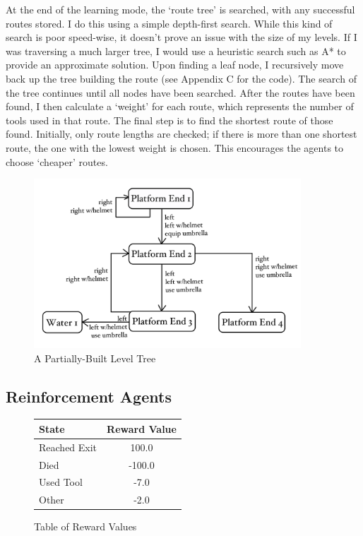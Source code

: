 \documentclass[a4paper,oneside]{report}
\begin{document}
At the end of the learning mode, the `route tree' is searched, with any successful routes stored. I do this using a simple depth-first search. While this kind of search is poor speed-wise, it doesn't prove an issue with the size of my levels. If I was traversing a much larger tree, I would use a heuristic search such as A* to provide an approximate solution. Upon finding a leaf node, I recursively move back up the tree building the route (see Appendix C for the code). The search of the tree continues until all nodes have been searched. After the routes have been found, I then calculate a `weight' for each route, which represents the number of tools used in that route. The final step is to find the shortest route of those found. Initially, only route lengths are checked; if there is more than one shortest route, the one with the lowest weight is chosen. This encourages the agents to choose `cheaper' routes.
  
\begin{figure}[H]
  \centering
    \includegraphics[width=100mm]{sources/images/TreeSample}
    \caption{A Partially-Built Level Tree}
    \label{fig:TreeSample}
\end{figure}

\subsection{Reinforcement Agents}

\begin{figure}
\centering
\begin{tabular}{| l | c |}
  \hline
  State  & Reward Value \\
  \hline
  Reached Exit    &  100.0 \\
  Died   		  &  -100.0 \\
  Used Tool       &  -7.0 \\
  Other  		  &  -2.0 \\
  \hline
\end{tabular}
\caption{Table of Reward Values}
\label{fig:Rewards}
\end{figure}
\end{document}
